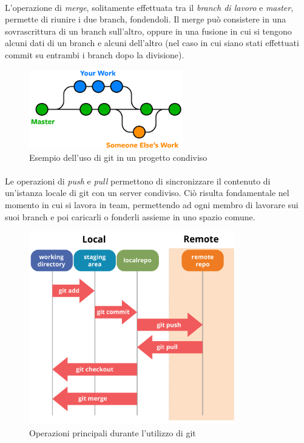 \documentclass[11pt,a4paper,english]{article}
\begin{document}
\paragraph{} L'operazione di \emph{merge}, solitamente effettuata tra il \emph{branch di lavoro} e \emph{master}, permette di riunire i due branch, fondendoli. Il merge può consistere in una sovrascrittura di un branch sull'altro, oppure in una fusione in cui si tengono alcuni dati di un branch e alcuni dell'altro (nel caso in cui siano stati effettuati commit su entrambi i branch dopo la divisione). 


\begin{figure}[H]
    \centering
    \includegraphics[width=0.6\textwidth]{img/git-condiviso.png}
    \caption{Esempio dell'uso di git in un progetto condiviso}
\end{figure}

\paragraph{} Le operazioni di \emph{push} e \emph{pull} permettono di sincronizzare il contenuto di un'istanza locale di git con un server condiviso. Ciò risulta fondamentale nel momento in cui si lavora in team, permettendo ad ogni membro di lavorare sui suoi branch e poi caricarli o fonderli assieme in uno spazio comune.


\begin{figure}[H]
    \centering
    \includegraphics[width=0.8\textwidth]{img/git-ops.png}
    \caption{Operazioni principali durante l'utilizzo di git}
\end{figure}
\end{document}
